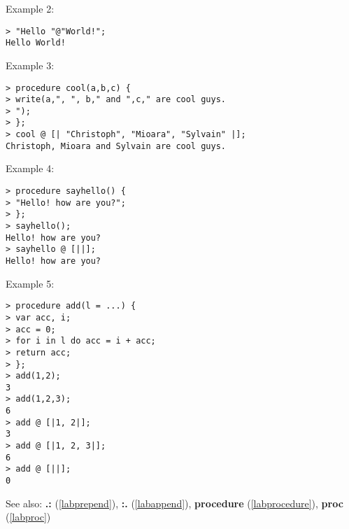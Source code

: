 \noindent Example 2: 
\begin{center}\begin{minipage}{15cm}\begin{Verbatim}[frame=single]
> "Hello "@"World!";
Hello World!
\end{Verbatim}
\end{minipage}\end{center}
\noindent Example 3: 
\begin{center}\begin{minipage}{15cm}\begin{Verbatim}[frame=single]
> procedure cool(a,b,c) { 
> write(a,", ", b," and ",c," are cool guys.
> ");
> };
> cool @ [| "Christoph", "Mioara", "Sylvain" |];
Christoph, Mioara and Sylvain are cool guys.
\end{Verbatim}
\end{minipage}\end{center}
\noindent Example 4: 
\begin{center}\begin{minipage}{15cm}\begin{Verbatim}[frame=single]
> procedure sayhello() { 
> "Hello! how are you?";
> };
> sayhello();
Hello! how are you?
> sayhello @ [||];
Hello! how are you?
\end{Verbatim}
\end{minipage}\end{center}
\noindent Example 5: 
\begin{center}\begin{minipage}{15cm}\begin{Verbatim}[frame=single]
> procedure add(l = ...) {
> var acc, i;
> acc = 0;
> for i in l do acc = i + acc;
> return acc;
> };
> add(1,2);
3
> add(1,2,3);
6
> add @ [|1, 2|];
3
> add @ [|1, 2, 3|];
6
> add @ [||];
0
\end{Verbatim}
\end{minipage}\end{center}
See also: \textbf{.:} (\ref{labprepend}), \textbf{:.} (\ref{labappend}), \textbf{procedure} (\ref{labprocedure}), \textbf{proc} (\ref{labproc})
